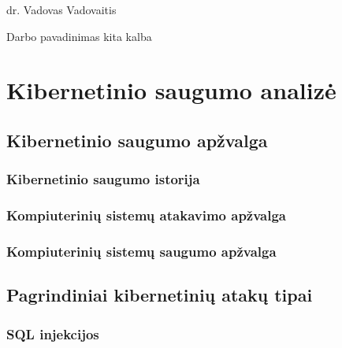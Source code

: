 \documentclass[a4paper,12pt,fleqn]{article}
\begin{document}
 {}{}{}{}%
 {dr. Vadovas Vadovaitis}

\tableofcontents



\bothabstracts{}%
{Darbo pavadinimas kita kalba} %
{}%






\newpage
\section{Kibernetinio saugumo analizė}
\label{sec:motivation}
\subsection{Kibernetinio saugumo apžvalga}


\subsubsection{Kibernetinio saugumo istorija}

\subsubsection{Kompiuterinių sistemų atakavimo apžvalga}

\subsubsection{Kompiuterinių sistemų saugumo apžvalga}

\subsection{Pagrindiniai kibernetinių atakų tipai}

\subsubsection{SQL injekcijos}
\end{document}
